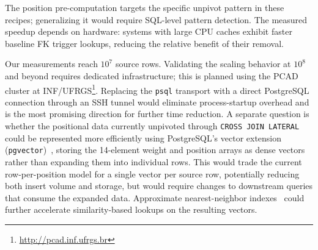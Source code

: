 \documentclass[journal]{IEEEtran}
\begin{document}
The position pre-computation targets the specific unpivot pattern in these recipes; generalizing it would require SQL-level pattern detection.
The measured speedup depends on hardware: systems with large CPU caches exhibit faster baseline FK trigger lookups, reducing the relative benefit of their removal.

Our measurements reach $10^7$ source rows.
Validating the scaling behavior at $10^8$ and beyond requires dedicated infrastructure; this is planned using the PCAD cluster at INF/UFRGS\footnote{\url{http://pcad.inf.ufrgs.br}}.
Replacing the \texttt{psql} transport with a direct PostgreSQL connection through an SSH tunnel would eliminate process-startup overhead and is the most promising direction for further time reduction.
A separate question is whether the positional data currently unpivoted through \texttt{CROSS JOIN LATERAL} could be represented more efficiently using PostgreSQL's vector extension (\texttt{pgvector})~\cite{pgvector2023}, storing the 14-element weight and position arrays as dense vectors rather than expanding them into individual rows.
This would trade the current row-per-position model for a single vector per source row, potentially reducing both insert volume and storage, but would require changes to downstream queries that consume the expanded data.
Approximate nearest-neighbor indexes~\cite{johnson2019faiss} could further accelerate similarity-based lookups on the resulting vectors.



\end{document}
